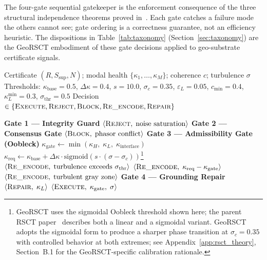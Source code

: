 \documentclass{article}
\begin{document}
The four-gate sequential gatekeeper is the enforcement consequence of the three structural independence theorems proved in~\citep{martin2026rsct}. Each gate catches a failure mode the others cannot see; gate ordering is a correctness guarantee, not an efficiency heuristic. The dispositions in Table~\ref{tab:taxonomy} (Section~\ref{sec:taxonomy}) are the GeoRSCT embodiment of these gate decisions applied to geo-substrate certificate signals.

\begin{algorithm}[H]
\caption{RSCT Pre-Execution Gatekeeper~\citep{martin2026rsct}}
\label{alg:gatekeeper}
\begin{algorithmic}[1]
\Require Certificate $(R, S_{\text{sup}}, N)$; modal health $\{\kappa_1,\ldots,\kappa_M\}$; coherence $c$; turbulence $\sigma$
\Require Thresholds: $\kappa_{\text{base}} = 0.5$, $\Delta\kappa = 0.4$, $s = 10.0$, $\sigma_c = 0.35$, $\varepsilon_L = 0.05$, $c_{\min} = 0.4$, $\kappa_L^{\min} = 0.3$, $\sigma_{\text{thr}} = 0.5$
\Ensure Decision $\in\{\textsc{Execute}, \textsc{Reject}, \textsc{Block}, \textsc{Re\_encode}, \textsc{Repair}\}$

\Statex
\State \textbf{Gate 1 --- Integrity Guard} 
  \State \Return $\langle\textsc{Reject},\;\text{noise saturation}\rangle$
\EndIf
\Statex
\State \textbf{Gate 2 --- Consensus Gate} 
  \State \Return $\langle\textsc{Block},\;\text{phasor conflict}\rangle$
\EndIf
\Statex
\State \textbf{Gate 3 --- Admissibility Gate (Oobleck)} 
\State $\kappa_{\text{gate}} \gets \min(\kappa_H,\;\kappa_L,\;\kappa_{\text{interface}})$
\State $\kappa_{\text{req}} \gets \kappa_{\text{base}} + \Delta\kappa \cdot \mathrm{sigmoid}(s \cdot (\sigma - \sigma_c))$\footnote{GeoRSCT uses the sigmoidal Oobleck threshold shown here; the parent RSCT paper~\citep{martin2026rsct} describes both a linear and a sigmoidal variant. GeoRSCT adopts the sigmoidal form to produce a sharper phase transition at $\sigma_c = 0.35$ with controlled behavior at both extremes; see Appendix~\ref{app:rsct_theory}, Section~B.1 for the GeoRSCT-specific calibration rationale.}
  \State \Return $\langle\textsc{Re\_encode},\;\text{turbulence exceeds } \sigma_{\text{thr}}\rangle$
  \State \Return $\langle\textsc{Re\_encode},\;\kappa_{\text{req}} - \kappa_{\text{gate}}\rangle$
 
    \State \Return $\langle\textsc{Re\_encode},\;\text{turbulent gray zone}\rangle$
  \EndIf
\EndIf
\Statex
\State \textbf{Gate 4 --- Grounding Repair} 
  \State \Return $\langle\textsc{Repair},\;\kappa_L\rangle$
\EndIf
\Statex
\State \Return $\langle\textsc{Execute},\;\kappa_{\text{gate}},\;\sigma\rangle$
\end{algorithmic}
\end{algorithm}
\end{document}
